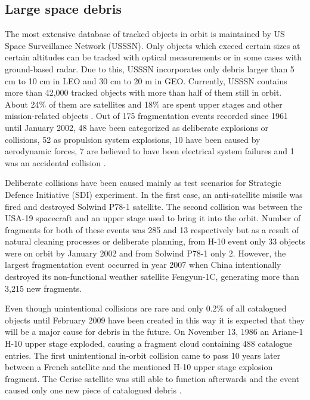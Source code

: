 \subsection{Large space debris}\label{subsec:large_space_debris}

	The most extensive database of tracked objects in orbit is maintained by US Space Surveillance Network (USSSN). Only objects which exceed certain sizes at certain altitudes can be tracked with optical measurements or in some cases with ground-based radar. Due to this, USSSN incorporates only debris larger than 5 cm to 10 cm in LEO and 30 cm to 20 m in GEO. Currently, USSSN contains more than 42,000 tracked objects with more than half of them still in orbit. About 24\% of them are satellites and 18\% are spent upper stages and other mission-related objects \citep{esabr336}. Out of 175 fragmentation events recorded since 1961 until January 2002, 48 have been categorized as deliberate explosions or collisions, 52 as propulsion system explosions, 10 have been caused by aerodynamic forces, 7 are believed to have been electrical system failures and 1 was an accidental collision \citep{klinkrad2006space}. 

	Deliberate collisions have been caused mainly as test scenarios for Strategic Defence Initiative (SDI) experiment. In the first case, an anti-satellite missile was fired and destroyed Solwind P78-1 satellite. The second collision was between the USA-19 spacecraft and an upper stage used to bring it into the orbit. Number of fragments for both of these events was 285 and 13 respectively but as a result of natural cleaning processes or deliberate planning, from H-10 event only 33 objects were on orbit by January 2002 and from Solwind P78-1 only 2. However, the largest fragmentation event occurred in year 2007 when China intentionally destroyed its non-functional weather satellite Fengyun-1C, generating more than 3,215 new fragments. 
	
	Even though unintentional collisions are rare and only 0.2\% of all catalogued objects until February 2009 have been created in this way it is expected that they will be a major cause for debris in the future. On November 13, 1986 an Ariane-1 H-10 upper stage exploded, causing a fragment cloud containing 488 catalogue entries. The first unintentional in-orbit collision came to pass 10 years later between a French satellite and the mentioned H-10 upper stage explosion fragment. The Cerise satellite was still able to function afterwards and the event caused only one new piece of catalogued debris \citep{Silha2012id}. 
	
